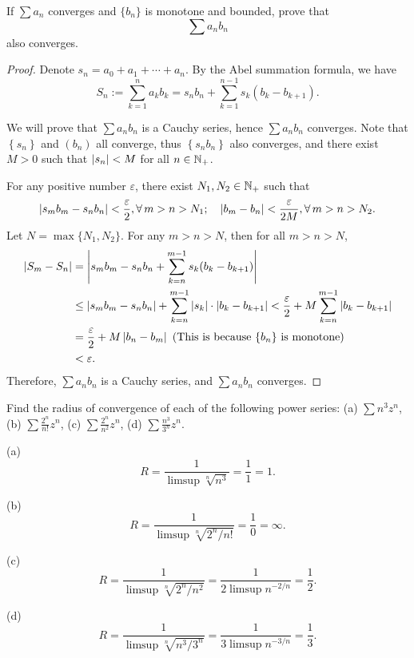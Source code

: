 \documentclass{article}
\begin{document}
\begin{problem}[3-8]
If $\sum a_n$ converges and $\{b_n\}$ is monotone and bounded, prove that
\[
\sum a_n b_n
\]
also converges.
\end{problem}

\begin{proof}
  Denote $s_n = a_0 + a_1 + \cdots + a_n$. By the Abel summation formula, we have
  \[ S_n:=\sum_{k=1}^{n}a_kb_k=s_nb_n+\sum_{k=1}^{n-1}s_k(b_k-b_{k+1}). \] \par
  We will prove that \( \sum a_nb_n \) is a Cauchy series, hence \( \sum a_nb_n \) converges. Note that \( \left\{s_n\right\} \) and \( \left(b_n\right) \) all converge, thus \( \left\{s_nb_n\right\} \) also converges, and there exist \( M>0 \) such that \( \left|s_n\right|<M \) for all \( n\in\mathbb{N}_+ \). \par
  For any positive number \( \varepsilon \), there exist \( N_1,N_2\in\mathbb{N}_+ \) such that
  \[ \left|s_mb_m-s_nb_n\right|<\frac{\varepsilon}{2}, \forall\,m>n>N_1;\quad \left|b_m-b_n\right|<\frac{\varepsilon}{2M}, \forall\,m>n>N_2. \] 
  Let \( N=\max\{N_1,N_2\} \). For any \( m>n>N \), then for all \( m>n>N \),
  \begin{align*}
    \left|S_m-S_n\right| & = \left|s_mb_m-s_nb_n+\sum_{k=n}^{m-1}s_k(b_k-b_{k+1})\right| \\
    & \le \left|s_mb_m-s_nb_n\right|+\sum_{k=n}^{m-1}\left|s_k\right|\cdot\left|b_k-b_{k+1}\right|
    < \frac{\varepsilon}{2}+M\sum_{k=n}^{m-1}\left|b_k-b_{k+1}\right| \\
    & = \frac{\varepsilon}{2}+M\left|b_{n}-b_m\right| \text{ (This is because $\{b_n\}$ is monotone)}\\
    &< \varepsilon.
  \end{align*}
  Therefore, \( \sum a_nb_n \) is a Cauchy series, and \( \sum a_nb_n \) converges.
\end{proof}



\begin{problem}[3-9]
Find the radius of convergence of each of the following power series: (a) $\displaystyle \sum n^3 z^n$, (b) $\displaystyle \sum \frac{2^n}{n!} z^n$, (c) $\displaystyle \sum \frac{2^n}{n^2} z^n$, (d) $\displaystyle \sum \frac{n^3}{3^n} z^n$.
\end{problem}

\begin{solution}
  (a) \[ R=\frac{1}{\limsup\sqrt[n]{n^3}} = \frac{1}{1} = 1. \]\par
  (b) \[ R=\frac{1}{\limsup\sqrt[n]{2^n/n!}} = \frac{1}{0} = \infty. \]\par
  (c) \[ R=\frac{1}{\limsup\sqrt[n]{2^n/n^2}} = \frac{1}{2\limsup n^{-2/n}} = \frac{1}{2}. \]\par
  (d) \[ R=\frac{1}{\limsup\sqrt[n]{n^3/3^n}} = \frac{1}{3\limsup n^{-3/n}} = \frac{1}{3}. \]\par
\end{solution}
\end{document}
